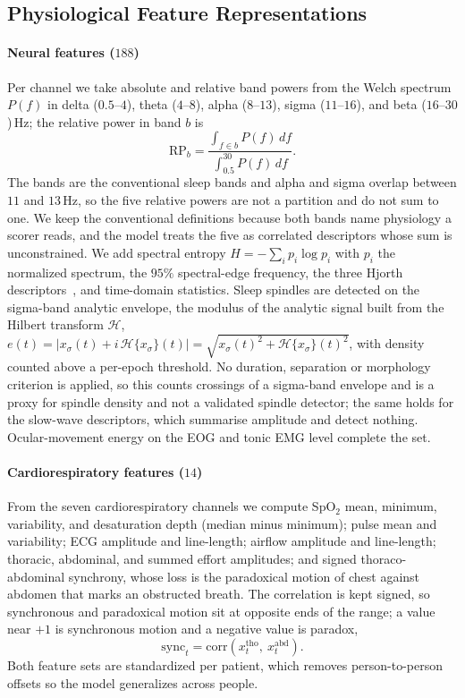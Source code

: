\documentclass{ieeeaccess}
\begin{document}
\subsection{Physiological Feature Representations}
\label{sec:features}
\paragraph{Neural features ($188$)}
Per channel we take absolute and relative band powers from the Welch spectrum $P(f)$ in delta
($0.5$--$4$), theta ($4$--$8$), alpha ($8$--$13$), sigma ($11$--$16$), and beta
($16$--$30$)\,Hz; the relative power in band $b$ is
\begin{equation}
\mathrm{RP}_b=\frac{\int_{f\in b}P(f)\,df}{\int_{0.5}^{30}P(f)\,df}.
\end{equation}
The bands are the conventional sleep bands and alpha and sigma overlap between $11$ and
$13$\,Hz, so the five relative powers are not a partition and do not sum to one. We keep the
conventional definitions because both bands name physiology a scorer reads, and the model
treats the five as correlated descriptors whose sum is unconstrained.
We add spectral entropy $H=-\sum_i p_i\log p_i$ with $p_i$ the normalized spectrum, the
$95\%$ spectral-edge frequency, the three Hjorth descriptors~\cite{hjorth1970eeg}, and
time-domain statistics. Sleep spindles are detected on the sigma-band analytic envelope,
the modulus of the analytic signal built from the Hilbert transform $\mathcal{H}$,
$e(t)=\lvert x_\sigma(t)+i\,\mathcal{H}\{x_\sigma\}(t)\rvert=\sqrt{x_\sigma(t)^2+\mathcal{H}\{x_\sigma\}(t)^2}$, with
density counted above a per-epoch threshold. No duration, separation or morphology criterion
is applied, so this counts crossings of a sigma-band envelope and is a proxy for spindle
density and not a validated spindle detector; the same holds for the slow-wave descriptors,
which summarise amplitude and detect nothing. Ocular-movement energy on
the EOG and tonic EMG level complete the set.

\paragraph{Cardiorespiratory features ($14$)}
From the seven cardiorespiratory channels we compute SpO$_2$ mean, minimum, variability, and
desaturation depth (median minus minimum); pulse mean and variability; ECG amplitude and
line-length; airflow amplitude and line-length; thoracic, abdominal, and summed effort
amplitudes; and signed thoraco-abdominal synchrony, whose loss is the paradoxical motion of
chest against abdomen that marks an obstructed breath. The correlation is kept signed, so
synchronous and paradoxical motion sit at opposite ends of the range; a value near $+1$ is synchronous motion and a negative value is paradox,
\begin{equation}
\mathrm{sync}_t=\mathrm{corr}(x^{\mathrm{tho}}_t,\ x^{\mathrm{abd}}_t).
\end{equation}
Both feature sets are standardized per patient, which removes person-to-person offsets so the
model generalizes across people.
\end{document}
